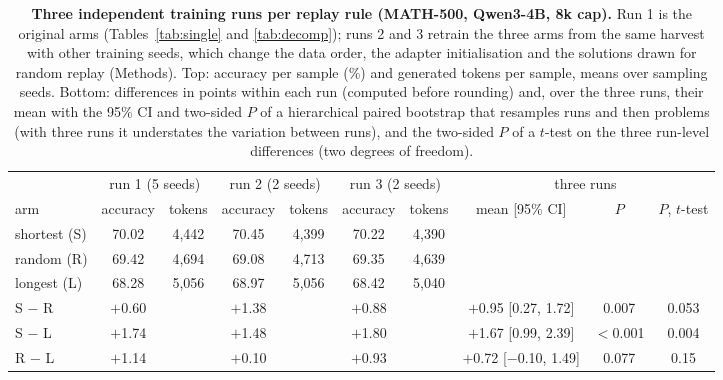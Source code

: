 \documentclass[10pt]{article}
\begin{document}
\begin{table}[t]
\centering\small
\caption{\textbf{Three independent training runs per replay rule (MATH-500, Qwen3-4B, 8k cap).} Run 1 is the original arms (Tables~\ref{tab:single} and \ref{tab:decomp}); runs 2 and 3 retrain the three arms from the same harvest with other training seeds, which change the data order, the adapter initialisation and the solutions drawn for random replay (Methods). Top: accuracy per sample (\%) and generated tokens per sample, means over sampling seeds. Bottom: differences in points within each run (computed before rounding) and, over the three runs, their mean with the 95\% CI and two-sided $P$ of a hierarchical paired bootstrap that resamples runs and then problems (with three runs it understates the variation between runs), and the two-sided $P$ of a $t$-test on the three run-level differences (two degrees of freedom).}
\label{tab:rep}
\setlength{\tabcolsep}{4pt}
\begin{tabular}{lccccccccc}
\toprule
 & \multicolumn{2}{c}{run 1 (5 seeds)} & \multicolumn{2}{c}{run 2 (2 seeds)} & \multicolumn{2}{c}{run 3 (2 seeds)} & \multicolumn{3}{c}{three runs} \\
\cmidrule(lr){2-3}\cmidrule(lr){4-5}\cmidrule(lr){6-7}\cmidrule(lr){8-10}
arm & accuracy & tokens & accuracy & tokens & accuracy & tokens & mean [95\% CI] & $P$ & $P$, $t$-test \\
\midrule
shortest (S) & 70.02 & 4{,}442 & 70.45 & 4{,}399 & 70.22 & 4{,}390 & & & \\
random (R) & 69.42 & 4{,}694 & 69.08 & 4{,}713 & 69.35 & 4{,}639 & & & \\
longest (L) & 68.28 & 5{,}056 & 68.97 & 5{,}056 & 68.42 & 5{,}040 & & & \\
\midrule
S $-$ R & $+$0.60 & & $+$1.38 & & $+$0.88 & & $+$0.95 [0.27, 1.72] & 0.007 & 0.053 \\
S $-$ L & $+$1.74 & & $+$1.48 & & $+$1.80 & & $+$1.67 [0.99, 2.39] & $<$0.001 & 0.004 \\
R $-$ L & $+$1.14 & & $+$0.10 & & $+$0.93 & & $+$0.72 [$-$0.10, 1.49] & 0.077 & 0.15 \\
\bottomrule
\end{tabular}
\end{table}
\end{document}
